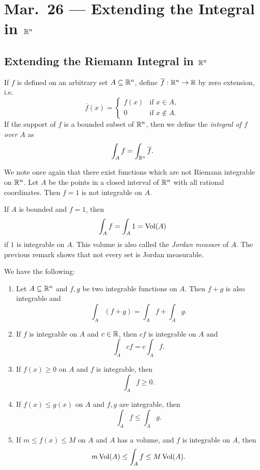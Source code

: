 \chapter{Mar.~26 --- Extending the Integral in \texorpdfstring{$\mathbb{R}^n$}{Rn}}

\section{Extending the Riemann Integral in \texorpdfstring{$\mathbb{R}^n$}{Rn}}
\begin{definition}
  If $f$ is defined on an arbitrary set
  $A \subseteq \mathbb{R}^n$, define $\overline{f} : \mathbb{R}^n \to \mathbb{R}$
  by zero extension, i.e.
  \[
    \overline{f}(x) = \begin{cases}
      f(x) & \text{if } x \in A, \\
      0 & \text{if } x \notin A.
    \end{cases}
  \]
  If the support of $f$ is a bounded subset of $\mathbb{R}^n$,
  then we define the \emph{integral of $f$ over $A$} as
  \[
    \int_A f = \int_{\mathbb{R}^n} \overline{f}.
  \]
\end{definition}

\begin{remark}
  We note once again that there exist functions which
  are not Riemann integrable on $\mathbb{R}^n$.
  Let $A$ be the points in a closed interval of
  $\mathbb{R}^n$ with all rational coordinates.
  Then $f = 1$ is not integrable on $A$.
\end{remark}

\begin{remark}
  If $A$ is bounded and $f = 1$, then
  \[
    \int_A f = \int_A 1 = \operatorname{Vol}(A)
  \]
  if $1$ is integrable on $A$. This volume is also called
  the \emph{Jordan measure} of $A$. The previous remark
  shows that not every set is Jordan measurable.
\end{remark}

\begin{prop}
  We have the following:
  \begin{enumerate}
    \item Let $A \subseteq \mathbb{R}^n$ and $f, g$ be two
      integrable functions on $A$. Then $f + g$ is
      also integrable and
      \[
        \int_A (f + g) = \int_A f + \int_A g.
      \]
    \item If $f$ is integrable on $A$ and $c \in \mathbb{R}$,
      then $cf$ is integrable on $A$ and
      \[
        \int_A cf = c \int_A f.
      \]
    \item If $f(x) \ge 0$ on $A$ and $f$ is integrable,
      then
      \[
        \int_A f \ge 0.
      \]
    \item If $f(x) \le g(x)$ on $A$ and $f, g$ are
      integrable, then
      \[
        \int_A f \le \int_A g.
      \]
    \item If $m \le f(x) \le M$ on $A$ and $A$ has a
      volume, and $f$ is integrable on $A$, then
      \[
      m \operatorname{Vol}(A) \le \int_A f \le M \operatorname{Vol}(A)
      .\]
  \end{enumerate}
\end{prop}

